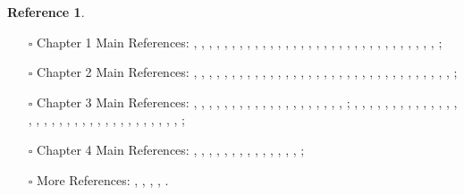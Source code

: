 \documentclass[12pt]{book}
\theoremstyle{definition}
\newtheorem{reference}{Reference}
\begin{document}
\begin{reference}\mbox{}
\begin{itemize}
\item[$\square$] Chapter 1 Main References: \cite{Sch1}, \cite{KL1}, \cite{KL2}, \cite{BL1}, \cite{BL2}, \cite{BS}, \cite{BHS}, \cite{Fon1}, \cite{CS1}, \cite{CS2}, \cite{BK}, \cite{BBK}, \cite{BBBK}, \cite{KKM}, \cite{KM}, \cite{LZ}, \cite{TT}, \cite{B}, \cite{Shi}, \cite{AI1}, \cite{AI2}, \cite{AI3}, \cite{AB1}, \cite{AB2}, \cite{Fon2}, \cite{Fon3}, \cite{Fa1}, \cite{M}, \cite{Fa2}, \cite{Fa3}, \cite{Fon4}, \cite{Fon5}, \cite{Fon6}; 
\item[$\square$] Chapter 2 Main References: \cite{Sch1}, \cite{Sch2}, \cite{FS}, \cite{KL1}, \cite{KL2}, \cite{BL1}, \cite{BL2}, \cite{BS}, \cite{BHS}, \cite{Fon1}, \cite{CS1}, \cite{CS2}, \cite{BK}, \cite{BBK}, \cite{BBBK}, \cite{KKM}, \cite{KM}, \cite{LZ}, \cite{TT}, \cite{B}, \cite{Shi}, \cite{AI1}, \cite{AI2}, \cite{AI3}, \cite{AB1}, \cite{AB2}, \cite{Fon2}, \cite{Fon3}, \cite{Fa1}, \cite{M}, \cite{Fa2}, \cite{Fa3}, \cite{Fon4}, \cite{Fon5}, \cite{Fon6};
\item[$\square$] Chapter 3 Main References: \cite{Sch1}, \cite{Sch2}, \cite{FS}, \cite{FF}, \cite{KL1}, \cite{KL2}, \cite{BL1}, \cite{BL2}, \cite{BS}, \cite{BHS}, \cite{Fon1}, \cite{CS1}, \cite{CS2}, \cite{BK}, \cite{BBK}, \cite{BBBK}, \cite{KKM}, \cite{KM}, \cite{LBV}, \cite{B}, \cite{SW}; \cite{Sch1}, \cite{Sch2}, \cite{FS}, \cite{KL1}, \cite{KL2}, \cite{BL1}, \cite{BL2}, \cite{BS}, \cite{BHS}, \cite{Fon1}, \cite{CS1}, \cite{CS2}, \cite{BK}, \cite{BBK}, \cite{BBBK}, \cite{KKM}, \cite{KM}, \cite{LZ}, \cite{TT}, \cite{B}, \cite{Shi}, \cite{AI1}, \cite{AI2}, \cite{AI3}, \cite{AB1}, \cite{AB2}, \cite{Fon2}, \cite{Fon3}, \cite{Fa1}, \cite{M}, \cite{Fa2}, \cite{Fa3}, \cite{Fon4}, \cite{Fon5}, \cite{Fon6};
\item[$\square$] Chapter 4 Main References: \cite{FS}, \cite{FF}, \cite{Sch1}, \cite{Sch2}, \cite{KL1}, \cite{KL2}, \cite{LBV}, \cite{B}, \cite{SW}, \cite{BS}, \cite{Lan1}, \cite{Drin1}, \cite{Drin2}, \cite{Zhu}, \cite{DHKM};
\item[$\square$] More References: \cite{Lan1}, \cite{Drin1}, \cite{Drin2}, \cite{Zhu}, \cite{DHKM}.
\end{itemize}
\end{reference}


\newpage
\end{document}
